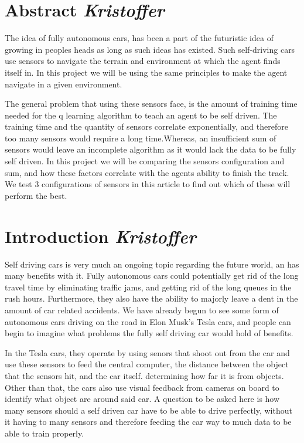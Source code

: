 \section{Abstract \small\textit{Kristoffer}}
\vspace{3mm}
The idea of fully autonomous cars, has been a part of the futuristic idea of growing in peoples heads as long as such ideas has existed. Such self-driving cars use sensors to navigate the terrain and environment at which the agent finds itself in.
In this project we will be using the same principles to make the agent navigate in a given environment. 

The general problem that using these sensors face, is the amount of training time needed for the q learning algorithm to teach an agent to be self driven. The training time and the quantity of sensors correlate exponentially, and therefore too many sensors would require a long time.Whereas, an insufficient sum of sensors would leave an incomplete algorithm as it would lack the data to be fully self driven. In this project we will be comparing the sensors configuration and sum, and how these factors correlate with the agents ability to finish the track. We test 3 configurations of sensors in this article to find out which of these will perform the best.
\vspace{5mm}

\section{Introduction \small\textit{Kristoffer}}
\vspace{3mm}
Self driving cars is very much an ongoing topic regarding the future world, an has many benefits with it. Fully autonomous cars could potentially get rid of the long travel time by eliminating traffic jams, and getting rid of the long queues in the rush hours. Furthermore, they also have the ability to majorly leave a dent in the amount of car related accidents. We have already begun to see some form of autonomous cars driving on the road in Elon Musk's Tesla cars, and people can begin to imagine what problems the fully self driving car would hold of benefits. 

In the Tesla cars, they operate by using senors that shoot out from the car and use these sensors to feed the central computer, the distance between the object that the sensors hit, and the car itself. determining how far it is from objects. Other than that, the cars also use visual feedback from cameras on board to identify what object are around said car. A question to be asked here is how many sensors should a self driven car have to be able to drive perfectly, without it having to many sensors and therefore feeding the car way to much data to be able to train properly. 

